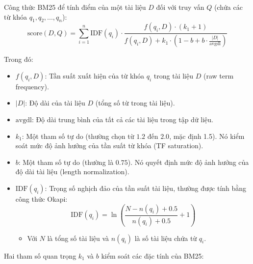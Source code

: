 \documentclass[../BTL.tex]{subfiles}
\begin{document}
Công thức BM25 để tính điểm của một tài liệu $D$ đối với truy vấn $Q$ (chứa các từ khóa $q_1, q_2, ..., q_n$):
$$
\text{score}(D, Q) = \sum_{i=1}^{n} \text{IDF}(q_i) \cdot \frac{f(q_i, D) \cdot (k_1 + 1)}{f(q_i, D) + k_1 \cdot (1 - b + b \cdot \frac{|D|}{\text{avgdl}})}
$$

Trong đó:
\begin{itemize}
    \item $f(q_i, D)$: Tần suất xuất hiện của từ khóa $q_i$ trong tài liệu $D$ (raw term frequency).
    
    \item $|D|$: Độ dài của tài liệu $D$ (tổng số từ trong tài liệu).
    
    \item $\text{avgdl}$: Độ dài trung bình của tất cả các tài liệu trong tập dữ liệu.
    
    \item $k_1$: Một tham số tự do (thường chọn từ $1.2$ đến $2.0$, mặc định 1.5). Nó kiểm soát mức độ ảnh hưởng của tần suất từ khóa (TF saturation).
    
    \item $b$: Một tham số tự do (thường là $0.75$). Nó quyết định mức độ ảnh hưởng của độ dài tài liệu (length normalization).
    
    \item $\text{IDF}(q_i)$: Trọng số nghịch đảo của tần suất tài liệu, thường được tính bằng công thức Okapi:$$\text{IDF}(q_i) = \ln \left( \frac{N - n(q_i) + 0.5}{n(q_i) + 0.5} + 1 \right)$$
    
    \begin{itemize}
        \item[] Với $N$ là tổng số tài liệu và $n(q_i)$ là số tài liệu chứa từ $q_i$.
    \end{itemize}
\end{itemize}

Hai tham số quan trọng $k_1$ và $b$ kiểm soát các đặc tính của BM25:
\end{document}
